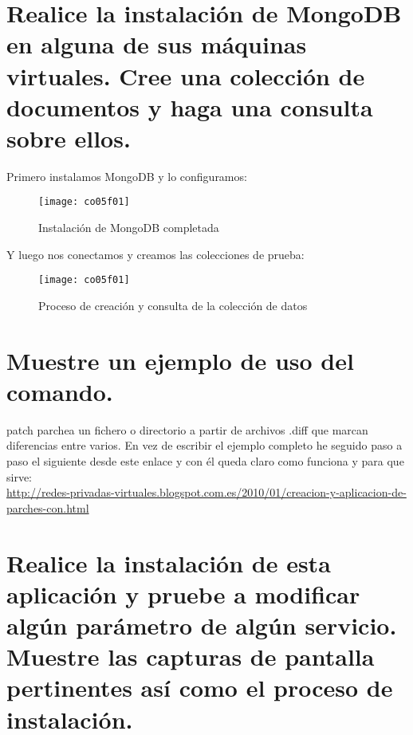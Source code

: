 \section{Realice la instalación de MongoDB en alguna de sus máquinas virtuales. Cree una colección de documentos y haga una consulta sobre ellos.}


Primero instalamos MongoDB y lo configuramos: \cite{11co02} \\
\begin{figure}[H]
	\centering
	\texttt{[image: co05f01]}
	\caption{Instalación de MongoDB completada}
	\label{fig:co05f01}
\end{figure}

Y luego nos conectamos y creamos las colecciones de prueba: \cite{11co03} \\
\begin{figure}[H]
	\centering
	\texttt{[image: co05f01]}
	\caption{Proceso de creación y consulta de la colección de datos}
	\label{fig:co05f02}
\end{figure}



\section{Muestre un ejemplo de uso del comando.}

patch parchea un fichero o directorio a partir de archivos .diff que marcan diferencias entre varios. 
En vez de escribir el ejemplo completo he seguido paso a paso el siguiente desde este enlace y con él queda claro como funciona y para que sirve:\\ \url{http://redes-privadas-virtuales.blogspot.com.es/2010/01/creacion-y-aplicacion-de-parches-con.html}


\section{Realice la instalación de esta aplicación y pruebe a modificar algún parámetro de algún servicio. Muestre las capturas de pantalla pertinentes así como el proceso de instalación. \cite{15co01}}


